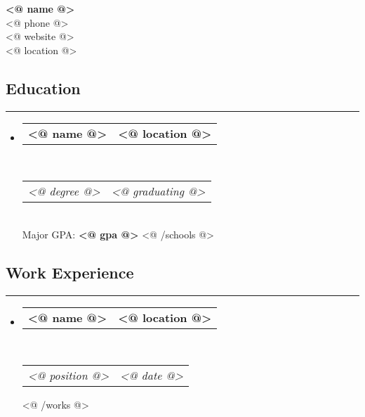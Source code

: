 \documentclass[11pt,letterpaper]{article}
\makeatletter
\newcommand{\headerrow}[2]
{\begin{tabular*}{\linewidth}{l@{\extracolsep{\fill}}r}
    #1 &
    #2 \\
\end{tabular*}}
\makeatother
\begin{document}
\setlength{\parindent}{0cm}

\begin{center}
{\LARGE \textbf{ <@ name @> }}
\\
<@ phone @>\ \ \textbullet
\ \ <@ email @>
\\ 
<@ website @>
\\
<@ location @>
\\
\end{center}
\vspace{-2em}

\subsection*{Education}
\vspace{-0.4em}
\hrule

\begin{itemize}[label={},leftmargin=*]
\parskip=0.1em

<@ #schools @>
\item
\headerrow 
{\textbf{ <@ name @> }}
{\textbf{ <@ location @> }}
\\
\headerrow
{\emph{ <@ degree @> }}
{\emph{ <@ graduating @> }}
\\
Major GPA: {\textbf{ <@ gpa @> }}
<@ /schools @>

\end{itemize}

\vspace{-1.5em}

\subsection*{Work Experience}
\vspace{-0.4em}
\hrule

\begin{itemize}[label={},leftmargin=*]
\parskip=0.1em

<@ #works @>
\item
\headerrow
{\textbf{<@ name @>}}
{\textbf{<@ location @>}}
\\
\headerrow
{\emph{ <@ position @> }}
{\emph{ <@ date @> }}

\vspace{0.4em}

<@ /works @>



\end{itemize}
\end{document}
